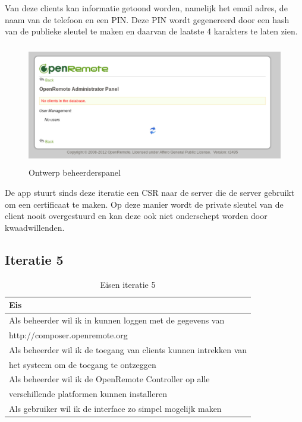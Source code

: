 \documentclass[]{article}
\begin{document}
Van deze clients kan informatie getoond worden, namelijk het email adres,
de naam van de telefoon en een PIN. Deze PIN wordt gegenereerd door een
hash van de publieke sleutel te maken en daarvan de laatste 4 karakters te
laten zien.

\begin{figure}[h!]
  \centering
    \includegraphics[height=150pt,keepaspectratio]{adminv1.pdf}
  \caption{Ontwerp beheerderspanel}
  \label{fig:adminv1}
\end{figure}

De app stuurt sinds deze iteratie een CSR naar de server die de server
gebruikt om een certificaat te maken. Op deze manier wordt de private
sleutel van de client nooit overgestuurd en kan deze ook niet onderschept
worden door kwaadwillenden.

\subsection{Iteratie 5}
\begin{table}[htpb]
  \caption{Eisen iteratie 5}
  \begin{center}
    \begin{tabular}{|| l ||}\hline
        Eis                                                              \\\hline\hline
        Als beheerder wil ik in kunnen loggen met de gegevens van        \\
        http://composer.openremote.org                                   \\\hline
        Als beheerder wil ik de toegang van clients kunnen intrekken van \\ 
        het systeem om de toegang te ontzeggen                           \\\hline
        Als beheerder wil ik de OpenRemote Controller op alle            \\ 
        verschillende platformen kunnen installeren                      \\\hline
        Als gebruiker wil ik de interface zo simpel mogelijk maken       \\\hline
    \end{tabular}
  \end{center}
\end{table}
\end{document}
